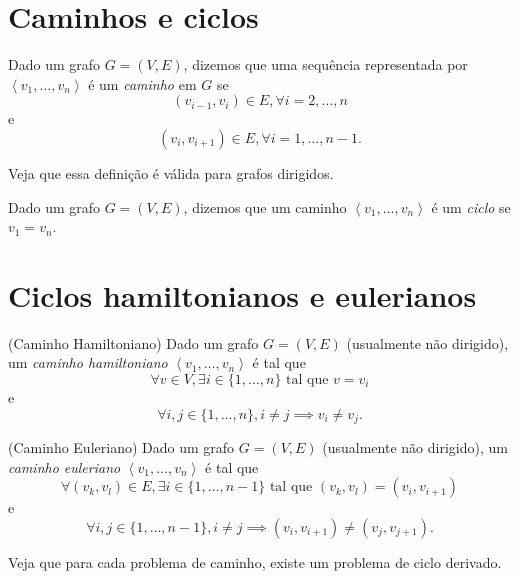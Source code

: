 
\section*{Caminhos e ciclos}

\begin{definition}
    Dado um grafo $G=\left( V,E \right) $, dizemos que uma sequência representada por $\left<v_1,\ldots,v_n \right>$ é um \emph{caminho} em $G$ se \[
    \left( v_{i-1},v_i \right) \in E, \forall i=2,\ldots,n
    \] e \[
    \left( v_i,v_{i+1} \right) \in E, \forall i=1,\ldots,n-1
    .\] 
    
    Veja que essa definição é válida para grafos dirigidos.
\end{definition}

\begin{definition}
    Dado um grafo $G=\left( V,E \right) $, dizemos que um caminho $\left<v_1,\ldots,v_n \right>$ é um \emph{ciclo} se $v_1=v_n$.
\end{definition}

\section*{Ciclos hamiltonianos e eulerianos}

\begin{problem}
    (Caminho Hamiltoniano) Dado um grafo $G=\left( V,E \right) $ (usualmente não dirigido), um \emph{caminho hamiltoniano} $\left< v_1,\ldots,v_n\right>$ é tal que \[
    \forall v \in V, \exists i\in \{1,\ldots,n\} \text{ tal que }v=v_i
    \] e \[
    \forall i,j \in \{1,\ldots,n\} , i\neq j \implies v_i \neq v_j
    .\] 
\end{problem}

\begin{problem}
    (Caminho Euleriano) Dado um grafo $G=\left( V,E \right) $ (usualmente não dirigido), um \emph{caminho euleriano} $\left< v_1,\ldots,v_n\right>$ é tal que \[
    \forall \left( v_k,v_l \right) \in E, \exists i\in \{1,\ldots,n-1\} \text{ tal que }\left( v_k, v_l \right) = \left( v_i, v_{i+1} \right) 
    \] e \[
    \forall i,j \in \{1,\ldots,n-1\} , i\neq j \implies \left( v_i,v_{i+1} \right) \neq \left( v_j, v_{j+1} \right) 
    .\] 
\end{problem}

\begin{note}
    Veja que para cada problema de caminho, existe um problema de ciclo derivado.
\end{note}

